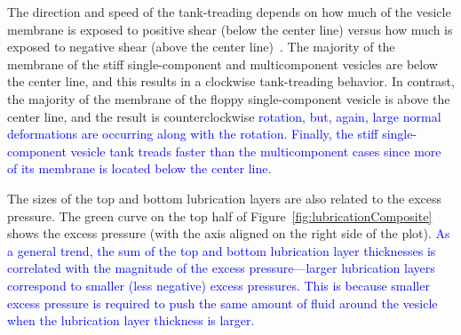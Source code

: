 \documentclass[twoside,twocolumn,9pt]{article}
\begin{document}
The direction and speed of the tank-treading depends on how much of the
vesicle membrane is exposed to positive shear (below the center line)
versus how much is exposed to negative shear (above the center
line)~\cite{kao-bir-mis2009}. The majority of the membrane of the stiff
single-component and multicomponent vesicles are below the center line,
and this results in a clockwise tank-treading behavior. In contrast, the
majority of the membrane of the floppy single-component vesicle is above
the center line, and the result is counterclockwise 
\textcolor{blue}{
rotation, but, again, large normal deformations are occurring along with
the rotation.
Finally, the stiff single-component vesicle tank treads faster than the
multicomponent cases since more of its membrane is located below the
center line.
}

The sizes of the top and bottom lubrication layers are also related to
the excess pressure. The green curve on the top half of
Figure~\ref{fig:lubricationComposite} shows the excess pressure (with
the axis aligned on the right side of the plot). 
\textcolor{blue}{
As a general trend, the sum of the top and bottom lubrication layer
thicknesses is correlated with the magnitude of the excess
pressure---larger lubrication layers correspond to smaller (less
negative) excess pressures. This is because smaller excess pressure is
required to push the same amount of fluid around the vesicle when the
lubrication layer thickness is larger.}
\end{document}
